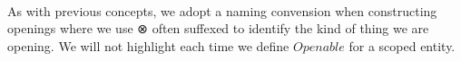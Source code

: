 \begin{code}%
\>[0]\AgdaSpace{}%
\AgdaSymbol{:}\AgdaSpace{}%
\AgdaSymbol{(}\AgdaSpace{}%
\AgdaSymbol{:}\AgdaSpace{}%
\AgdaSymbol{)}\AgdaSpace{}%
\AgdaSpace{}%
\<%
\\
\>[0]\AgdaSpace{}%
\AgdaSpace{}%
\AgdaSymbol{=}\AgdaSpace{}%
\AgdaSpace{}%
\AgdaSymbol{\{}\AgdaSymbol{\}}\AgdaSpace{}%
\AgdaSpace{}%
\AgdaSymbol{(}\AgdaSpace{}%
\AgdaSymbol{:}\AgdaSpace{}%
\AgdaSymbol{)}\AgdaSpace{}%
\AgdaSpace{}%
\AgdaSpace{}%
\AgdaSpace{}%
\AgdaSpace{}%
\AgdaSpace{}%
\AgdaSymbol{(}\AgdaSpace{}%
\AgdaOperator{\AgdaPrimitive{+}}\AgdaSpace{}%
\AgdaSymbol{)}\<%
\end{code}
As with previous concepts, we adopt a naming convension when constructing
openings where we use ⊗ often suffexed to identify the kind of thing we
are opening. We will not highlight each time we define $Openable$ for
a scoped entity.

